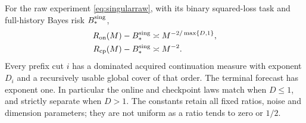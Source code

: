 \begin{theorem}\label{thm:singularserial}
For the raw experiment \eqref{eq:singularraw}, with its binary squared-loss task and full-history Bayes risk $B_*^{\rm sing}$,
\begin{align}
 R_{\mathrm{on}}(M)-B_*^{\rm sing}&\asymp M^{-2/\max\{D,1\}},\label{eq:singularonline}\\
 R_{\mathrm{cp}}(M)-B_*^{\rm sing}&\asymp M^{-2}.\label{eq:singularcheckpoint}
\end{align}
Every prefix cut $i$ has a dominated acquired continuation measure with exponent $D_i$ and a recursively usable global cover of that order. The terminal forecast has exponent one. In particular the online and checkpoint laws match when $D\le1$, and strictly separate when $D>1$. The constants retain all fixed ratios, noise and dimension parameters; they are not uniform as a ratio tends to zero or $1/2$.
\end{theorem}

